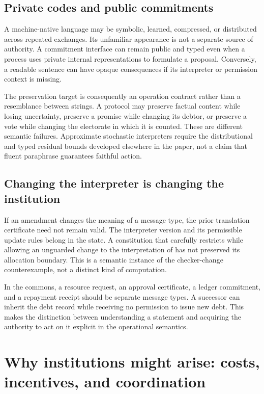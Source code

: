 \subsection{Private codes and public commitments}
A machine-native language may be symbolic, learned, compressed, or distributed across repeated exchanges. Its unfamiliar appearance is not a separate source of authority. A commitment interface can remain public and typed even when a process uses private internal representations to formulate a proposal. Conversely, a readable sentence can have opaque consequences if its interpreter or permission context is missing.

The preservation target is consequently an operation contract rather than a resemblance between strings. A protocol may preserve factual content while losing uncertainty, preserve a promise while changing its debtor, or preserve a vote while changing the electorate in which it is counted. These are different semantic failures. Approximate stochastic interpreters require the distributional and typed residual bounds developed elsewhere in the paper, not a claim that fluent paraphrase guarantees faithful action.

\subsection{Changing the interpreter is changing the institution}
If an amendment changes the meaning of a message type, the prior translation certificate need not remain valid. The interpreter version and its permissible update rules belong in the state. A constitution that carefully restricts  while allowing an unguarded change to the interpretation of  has not preserved its allocation boundary. This is a semantic instance of the checker-change counterexample, not a distinct kind of computation.

In the commons, a resource request, an approval certificate, a ledger commitment, and a repayment receipt should be separate message types. A successor can inherit the debt record while receiving no permission to issue new debt. This makes the distinction between understanding a statement and acquiring the authority to act on it explicit in the operational semantics.

\section{Why institutions might arise: costs, incentives, and coordination}\label{MS:sec:institution-formation}

